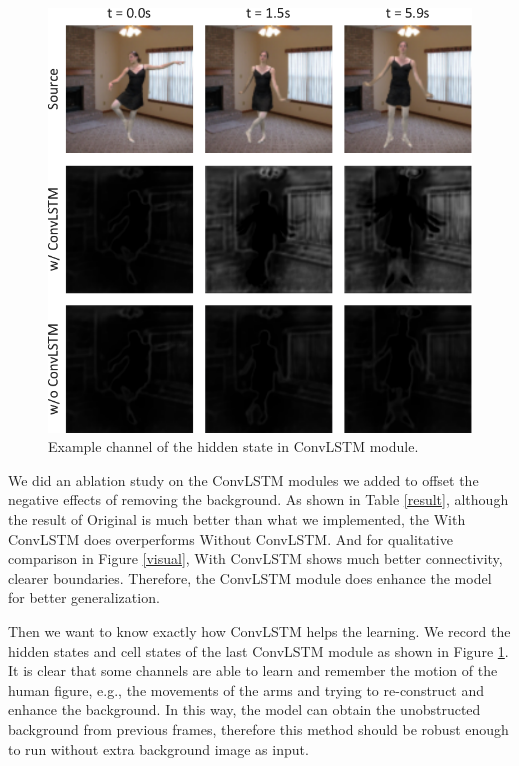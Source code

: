 \documentclass[final]{cvpr}
\begin{document}
\begin{figure}[htb]
    \begin{center}
        \includegraphics[width=1\linewidth]{img/ablationStudy.pdf}
    \end{center}
    \caption{Example channel of the hidden state in ConvLSTM module.}
    \label{ablationStudy}
\end{figure}

We did an ablation study on the ConvLSTM modules we added to offset the negative effects of removing the background.
As shown in Table \ref{result}, although the result of Original is much better than what we implemented, the With ConvLSTM does overperforms Without ConvLSTM.
And for qualitative comparison in Figure \ref{visual}, With ConvLSTM shows much better connectivity, clearer boundaries.
Therefore, the ConvLSTM module does enhance the model for better generalization.

Then we want to know exactly how ConvLSTM helps the learning.
We record the hidden states and cell states of the last ConvLSTM module as shown in Figure \ref{ablationStudy}.
It is clear that some channels are able to learn and remember the motion of the human figure, e.g., the movements of the arms and trying to re-construct and enhance the background.
In this way, the model can obtain the unobstructed background from previous frames, therefore this method should be robust enough to run without extra background image as input.
\end{document}
